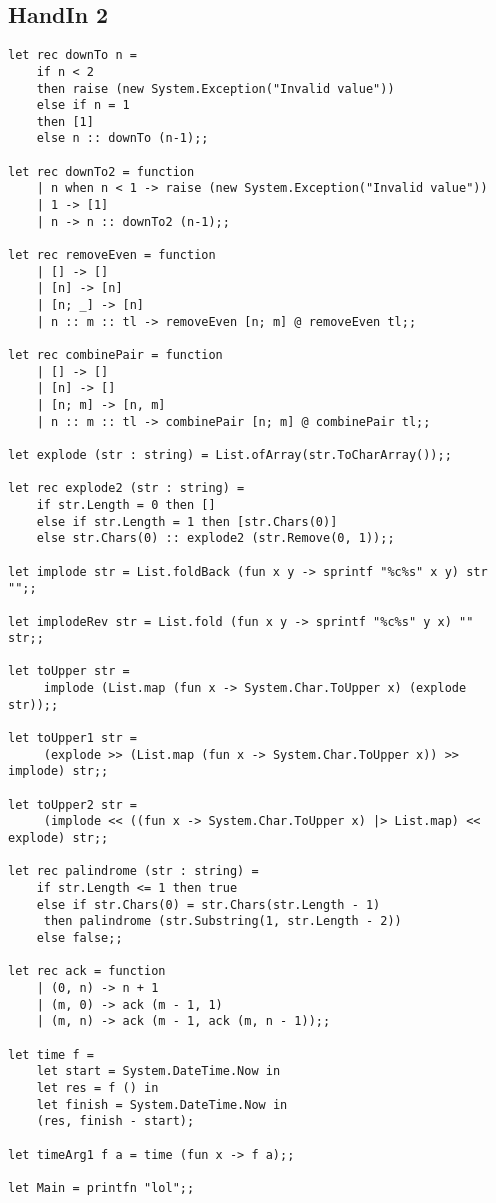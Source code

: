 \subsection{HandIn 2}
\label{Appendix_FSharp_Ulrik_2}
\begin{lstlisting}
let rec downTo n =
    if n < 2
    then raise (new System.Exception("Invalid value"))
    else if n = 1
    then [1]
    else n :: downTo (n-1);;

let rec downTo2 = function
    | n when n < 1 -> raise (new System.Exception("Invalid value"))
    | 1 -> [1]
    | n -> n :: downTo2 (n-1);;

let rec removeEven = function
    | [] -> []
    | [n] -> [n]
    | [n; _] -> [n]
    | n :: m :: tl -> removeEven [n; m] @ removeEven tl;;

let rec combinePair = function
    | [] -> []
    | [n] -> []
    | [n; m] -> [n, m]
    | n :: m :: tl -> combinePair [n; m] @ combinePair tl;;

let explode (str : string) = List.ofArray(str.ToCharArray());;

let rec explode2 (str : string) =
	if str.Length = 0 then []
	else if str.Length = 1 then [str.Chars(0)]
	else str.Chars(0) :: explode2 (str.Remove(0, 1));;
	
let implode str = List.foldBack (fun x y -> sprintf "%c%s" x y) str "";;

let implodeRev str = List.fold (fun x y -> sprintf "%c%s" y x) "" str;;

let toUpper str = 
     implode (List.map (fun x -> System.Char.ToUpper x) (explode str));;

let toUpper1 str = 
     (explode >> (List.map (fun x -> System.Char.ToUpper x)) >> implode) str;;

let toUpper2 str = 
     (implode << ((fun x -> System.Char.ToUpper x) |> List.map) << explode) str;;

let rec palindrome (str : string) =
    if str.Length <= 1 then true
    else if str.Chars(0) = str.Chars(str.Length - 1)
	 then palindrome (str.Substring(1, str.Length - 2))
    else false;;

let rec ack = function
    | (0, n) -> n + 1
    | (m, 0) -> ack (m - 1, 1)
    | (m, n) -> ack (m - 1, ack (m, n - 1));;

let time f =
    let start = System.DateTime.Now in
    let res = f () in
    let finish = System.DateTime.Now in
    (res, finish - start);

let timeArg1 f a = time (fun x -> f a);;

let Main = printfn "lol";;

\end{lstlisting}
